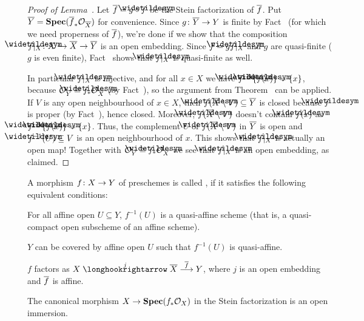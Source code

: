 \documentclass[a4paper,parskip=half,numbers=enddot, DIV=12]{scrreprt}
\begin{document}
\begin{proof}[Proof of Lemma~]
	Let $\ov{f}=g\circ \snake{f}$ be the Stein factorization of $\overline{f}$. Put $\overline{Y}=\operatorname{\mathbf{Spec}}(\overline{f}_*\mathcal{O}_{\overline{X}})$ for convenience. Since $g\colon \ov{Y}\morphism Y$ is finite by Fact~ (for which we need properness of $\overline{f}$), we're done if we show that the composition $\snake{f}|_X\colon X\monomorphism \ov{X}\morphism \ov{Y}$ is an open embedding. Since $f=g\snake{f}|_X$ and $g$ are quasi-finite ($g$ is even finite), Fact~ shows that $\snake{f}|_X$ is quasi-finite as well.
	
	In particular $\snake{f}|_X$ is injective, and for all $x\in X$ we have $\snake{f}^{-1}\{\snake{f}(x)\}=\{x\}$, because $\Oo_{\ov{Y}}\cong \snake{f}_*\Oo_{\ov{X}}$ (by Fact~), so the argument from Theorem~ can be applied. If $V$ is any open neighbourhood of $x\in X$, then $\snake{f}(\ov{X}\setminus V)\subseteq \ov{Y}$ is closed because $\snake{f}$ is proper (by Fact~), hence closed. Moreover, $\snake{f}(\ov{X}\setminus V)$ doesn't contain $\snake{f}(x)$ as $\snake{f}^{-1}\{\snake{f}(x)\}=\{x\}$. Thus, the complement $U$ of $\snake{f}(\ov{X}\setminus V)$ in $\overline{Y}$ is open and $\snake{f}^{-1}(U)\subseteq V$ is an open neighbourhood of $x$. This shows that $\snake{f}|_X$ is actually an open map! Together with $\Oo_{\ov{Y}}\cong \snake{f}_*\Oo_{\ov{X}}$ we see that $\snake{f}|_X$ is an open embedding, as claimed.
\end{proof}
\begin{defi}
	A morphism $f\colon X\morphism Y$ of preschemes is called , if it satisfies the following equivalent conditions:
	\begin{alphanumerate}
		\item For all affine open $U\subseteq Y$, $f^{-1}(U)$ is a quasi-affine scheme (that is, a quasi-compact open subscheme of an affine scheme).
		\item $Y$ can be covered by affine open $U$ such that $f^{-1}(U)$ is quasi-affine.
		\item $f$ factors as $X\monomorphism[j]\ov{X}\morphism[\smash{\ov{f}}]Y$, where $j$ is an open embedding and $\overline{f}$ is affine.
		\item The canonical morphism $X\morphism\SPEC(f_*\Oo_X)$ in the Stein factorization is an open immersion.
	\end{alphanumerate}
\end{defi}
\end{document}
